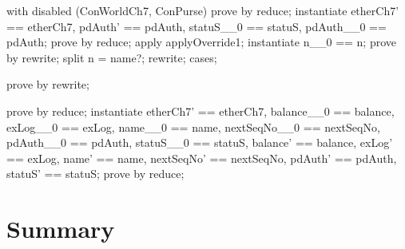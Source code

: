 \begin{LPScript}\begin{zproof}[tConcAckOkayPRE]
    with disabled (ConWorldCh7, ConPurse) prove by reduce;
    instantiate etherCh7' == etherCh7, pdAuth' == pdAuth,
        statuS\_\_0 == statuS, pdAuth\_\_0 == pdAuth;
    prove by reduce;
    apply applyOverride1;
    instantiate n\_\_0 == n;
    prove by rewrite;
    split n = name?;
    rewrite;
    cases;
\end{zproof}\end{LPScript}

\begin{LPScript}\begin{zproof}[tConcReadExceptionLogOkayPRE]
\end{zproof}\end{LPScript}

\begin{LDCheck}\begin{zproof}
    prove by rewrite;
\end{zproof}\end{LDCheck}

\begin{LPScript}\begin{zproof}[tConcClearExceptionLogOkayPRE]
\end{zproof}\end{LPScript}

\begin{LPScript}\begin{zproof}[tConcAuthoriseExLogClearOkayPRE]
    prove by reduce;
    instantiate etherCh7' == etherCh7, balance\_\_0 == balance,
        exLog\_\_0 == exLog, name\_\_0 == name, nextSeqNo\_\_0 == nextSeqNo,
        pdAuth\_\_0 == pdAuth, statuS\_\_0 == statuS,
        balance' == balance, exLog' == exLog, name' == name,
        nextSeqNo' == nextSeqNo, pdAuth' == pdAuth,
        statuS' == statuS;
    prove by reduce;
\end{zproof}\end{LPScript}

\newpage
\section{Summary}\label{ch8.ps.summary}
\lpscriptsummary


